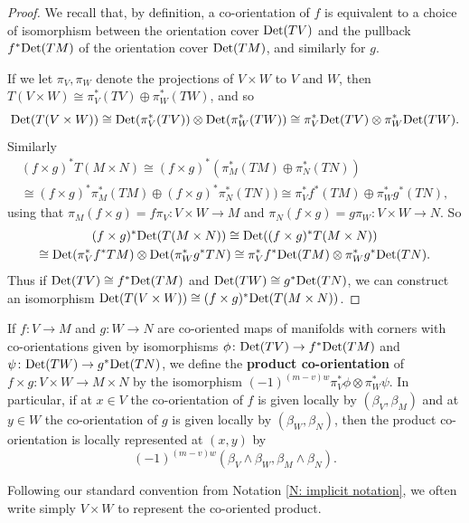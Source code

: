 \begin{proof}
	We recall that, by definition, a co-orientation of $f$ is equivalent to a choice of isomorphism between the orientation cover ${\rm Det}(TV)$ and the pullback $f^*{\rm Det}(TM)$ of the orientation cover ${\rm Det}(TM)$, and similarly for $g$.

	If we let $\pi_V, \pi_W$ denote the projections of $V \times W$ to $V$ and $W$, then $T(V \times W) \cong \pi_V^*(TV) \oplus \pi_W^*(TW)$, and so $${\rm Det}(T(V \times W)) \cong {\rm Det}(\pi_V^*(TV))\otimes{\rm Det}(\pi_W^*(TW)) \cong \pi_V^*{\rm Det}(TV)\otimes\pi_W^*{\rm Det}(TW).$$ Similarly
	\begin{multline*}(f \times g)^*T(M \times N) \cong (f \times g)^*(\pi_M^*(TM) \oplus \pi_N^*(TN))\\
		\cong (f \times g)^*\pi_M^*(TM) \oplus (f \times g)^*\pi_N^*(TN)) \cong \pi_V^*f^*(TM) \oplus \pi_W^*g^*(TN),
	\end{multline*}
	using that $\pi_M(f \times g) = f\pi_V \colon V \times W \to M$ and $\pi_N(f \times g) = g\pi_W \colon V \times W \to N$.
	So
	\begin{multline*}
		(f \times g)^*{\rm Det}(T(M \times N)) \cong {\rm Det}((f \times g)^*T(M \times N))\\ \cong {\rm Det}(\pi_V^*f^*TM) \otimes {\rm Det}(\pi_W^*g^*TN) \cong \pi_V^*f^*{\rm Det}(TM) \otimes \pi_W^*g^*{\rm Det}(TN).
	\end{multline*}
	Thus if ${\rm Det}(TV) \cong f^*{\rm Det}(TM)$ and ${\rm Det}(TW) \cong g^*{\rm Det}(TN)$, we can construct an isomorphism ${\rm Det}(T(V \times W)) \cong (f \times g)^*{\rm Det}(T(M \times N))$.
\end{proof}

\begin{definition}\label{D: co-oriented exterior}
	If $f \colon V \to M$ and $g \colon W \to N$ are co-oriented maps of manifolds with corners with co-orientations given by isomorphisms $\phi \colon {\rm Det}(TV) \to f^*{\rm Det}(TM)$ and $\psi \colon {\rm Det}(TW) \to g^*{\rm Det}(TN)$, we define the \textbf{product co-orientation} of $f \times g \colon V \times W \to M \times N$ by the isomorphism $(-1)^{(m-v)w}\pi_V^*\phi \otimes \pi_W^*\psi$.
	In particular, if at $x \in V$ the co-orientation of $f$ is given locally by $(\beta_V,\beta_M)$ and at $y \in W$ the co-orientation of $g$ is given locally by $(\beta_W,\beta_N)$, then the product co-orientation is locally represented at $(x,y)$ by $$(-1)^{(m-v)w}(\beta_V \wedge \beta_W,\beta_M \wedge \beta_N).$$

	Following our standard convention from Notation \ref{N: implicit notation}, we often write simply $V \times W$ to represent the co-oriented product.
\end{definition}


